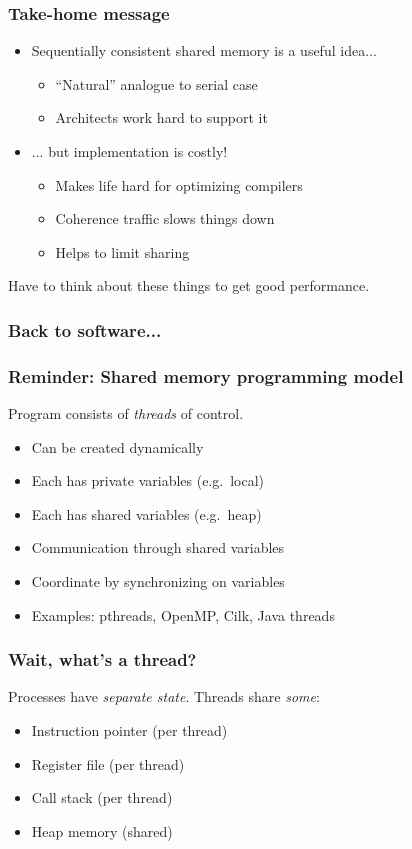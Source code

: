 \documentclass{beamer}
\begin{document}
\begin{frame}
  \frametitle{Take-home message}

  \begin{itemize}
  \item Sequentially consistent shared memory is a useful idea...
    \begin{itemize}
    \item ``Natural'' analogue to serial case
    \item Architects work hard to support it
    \end{itemize}
  \item ... but implementation is costly!
    \begin{itemize}
    \item Makes life hard for optimizing compilers
    \item Coherence traffic slows things down
    \item Helps to limit sharing
    \end{itemize}
  \end{itemize}
  \vspace{1cm}
  Have to think about these things to get good performance.

\end{frame}


\begin{frame}
  \frametitle{Back to software...}
\end{frame}


\begin{frame}
  \frametitle{Reminder: Shared memory programming model}
  
  Program consists of {\em threads} of control.
  \begin{itemize}
  \item Can be created dynamically
  \item Each has private variables (e.g.~local)
  \item Each has shared variables (e.g.~heap)
  \item Communication through shared variables
  \item Coordinate by synchronizing on variables
  \item Examples: pthreads, OpenMP, Cilk, Java threads
  \end{itemize}

\end{frame}


\begin{frame}
  \frametitle{Wait, what's a thread?}

  Processes have {\em separate state}.  Threads share {\em some}:
  \begin{itemize}
  \item Instruction pointer (per thread)
  \item Register file (per thread)
  \item Call stack (per thread)
  \item Heap memory (shared)
  \end{itemize}

\end{frame}
\end{document}
